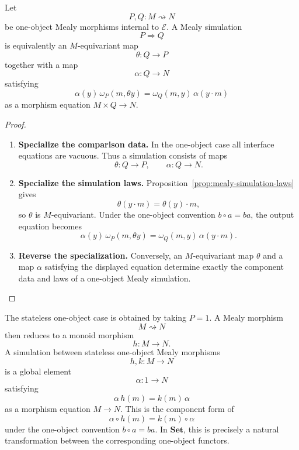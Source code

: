 \begin{proposition}
\label{prop:one-object-mealy-simulations}
    Let
    \[
        P,Q:M\rightsquigarrow N
    \]
    be one-object Mealy morphisms internal to \(\mathcal E\). A Mealy simulation
    \[
        P\Rightarrow Q
    \]
    is equivalently an \(M\)-equivariant map
    \[
        \theta:Q\to P
    \]
    together with a map
    \[
        \alpha:Q\to N
    \]
    satisfying
    \[
        \alpha(y)\,\omega_P(m,\theta y)
        =
        \omega_Q(m,y)\,\alpha(y\cdot m)
    \]
    as a morphism equation \(M\times Q\to N\).
\end{proposition}
\begin{proof}
    \leavevmode
    \begin{enumerate}
        \item \textbf{Specialize the comparison data.} In the one-object case all interface equations are vacuous. Thus a simulation consists of maps
        \[
            \theta:Q\to P,
            \qquad
            \alpha:Q\to N.
        \]

        \item \textbf{Specialize the simulation laws.} Proposition~\ref{prop:mealy-simulation-laws} gives
        \[
            \theta(y\cdot m)=\theta(y)\cdot m,
        \]
        so \(\theta\) is \(M\)-equivariant. Under the one-object convention \(b\circ a=ba\), the output equation becomes
        \[
            \alpha(y)\,\omega_P(m,\theta y)
            =
            \omega_Q(m,y)\,\alpha(y\cdot m).
        \]

        \item \textbf{Reverse the specialization.} Conversely, an \(M\)-equivariant map \(\theta\) and a map \(\alpha\) satisfying the displayed equation determine exactly the component data and laws of a one-object Mealy simulation.
    \end{enumerate}
\end{proof}

The stateless one-object case is obtained by taking \(P=1\). A Mealy morphism
\[
    M\rightsquigarrow N
\]
then reduces to a monoid morphism
\[
    h:M\to N.
\]
A simulation between stateless one-object Mealy morphisms
\[
    h,k:M\to N
\]
is a global element
\[
    \alpha:1\to N
\]
satisfying
\[
    \alpha\,h(m)=k(m)\,\alpha
\]
as a morphism equation \(M\to N\). This is the component form of
\[
    \alpha\circ h(m)=k(m)\circ\alpha
\]
under the one-object convention \(b\circ a=ba\). In \(\mathbf{Set}\), this is precisely a natural transformation between the corresponding one-object functors.

